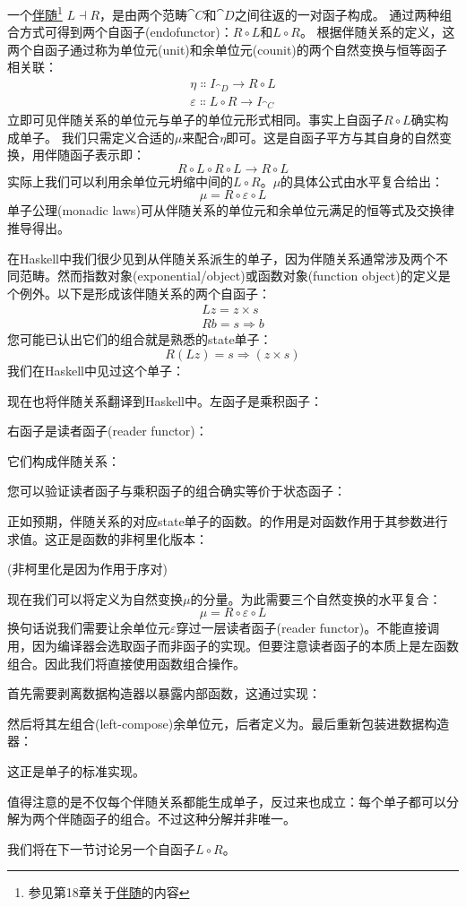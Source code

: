 一个\hyperref[adjunctions]{伴随}\footnote{参见第18章关于\hyperref[adjunctions]{伴随}的内容}
$L \dashv R$，是由两个范畴$\cat{C}$和$\cat{D}$之间往返的一对函子构成。
通过两种组合方式可得到两个自函子(endofunctor)：$R \circ L$和$L \circ R$。
根据伴随关系的定义，这两个自函子通过称为单位元(unit)和余单位元(counit)的两个自然变换与恒等函子相关联：
\begin{gather*}
  \eta \Colon I_{\cat{D}} \to R \circ L \\
  \varepsilon \Colon L \circ R \to I_{\cat{C}}
\end{gather*}
立即可见伴随关系的单位元与单子的单位元形式相同。事实上自函子$R \circ L$确实构成单子。
我们只需定义合适的$\mu$来配合$\eta$即可。这是自函子平方与其自身的自然变换，用伴随函子表示即：
$$R \circ L \circ R \circ L \to R \circ L$$
实际上我们可以利用余单位元坍缩中间的$L \circ R$。$\mu$的具体公式由水平复合给出：
$$\mu = R \circ \varepsilon \circ L$$
单子公理(monadic laws)可从伴随关系的单位元和余单位元满足的恒等式及交换律推导得出。

在Haskell中我们很少见到从伴随关系派生的单子，因为伴随关系通常涉及两个不同范畴。然而指数对象(exponential/object)或函数对象(function object)的定义是个例外。以下是形成该伴随关系的两个自函子：
\begin{gather*}
  L z = z\times{}s \\
  R b = s \Rightarrow b
\end{gather*}
您可能已认出它们的组合就是熟悉的state单子：
$$R (L z) = s \Rightarrow (z\times{}s)$$
我们在Haskell中见过这个单子：

现在也将伴随关系翻译到Haskell中。左函子是乘积函子：

右函子是读者函子(reader functor)：

它们构成伴随关系：

您可以验证读者函子与乘积函子的组合确实等价于状态函子：

正如预期，伴随关系的对应state单子的函数。的作用是对函数作用于其参数进行求值。这正是函数的非柯里化版本：

(非柯里化是因为作用于序对)

现在我们可以将定义为自然变换$\mu$的分量。为此需要三个自然变换的水平复合：
$$\mu = R \circ \varepsilon \circ L$$
换句话说我们需要让余单位元$\varepsilon$穿过一层读者函子(reader functor)。不能直接调用，因为编译器会选取函子而非函子的实现。但要注意读者函子的本质上是左函数组合。因此我们将直接使用函数组合操作。

首先需要剥离数据构造器以暴露内部函数，这通过实现：

然后将其左组合(left-compose)余单位元，后者定义为。最后重新包装进数据构造器：

这正是单子的标准实现。

值得注意的是不仅每个伴随关系都能生成单子，反过来也成立：每个单子都可以分解为两个伴随函子的组合。不过这种分解并非唯一。

我们将在下一节讨论另一个自函子$L \circ R$。